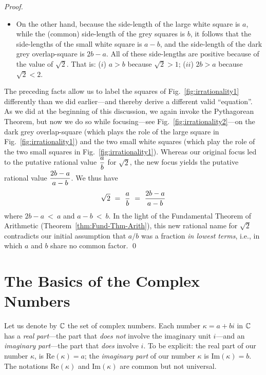 \begin{proof}
\begin{itemize}
\medskip\item
On the other hand, because the side-length of the large white square is $a$, while the (common) side-length of the grey squares is $b$, it follows that the side-lengths of the small white square is $a-b$, and the side-length of the dark grey overlap-square is $2b-a$.  All of these side-lengths are positive because of the value of $\sqrt{2}$.  That is: ($i$) $a > b$ because $\sqrt{2} >1$; ($ii$) $2b >a$ because $\sqrt{2} < 2$.
\end{itemize}
The preceding facts allow us to label the squares of Fig.~\ref{fig:irrationality1} differently than we did earlier---and thereby derive a different valid ``equation''.  As we did at the beginning of this discussion, we again invoke the Pythagorean Theorem, but now we do so while focusing---see Fig.~\ref{fig:irrationality2}---on the dark grey overlap-square (which plays the role of the large square in Fig.~\ref{fig:irrationality1}) and the two small white squares (which play the role of the two small squares in Fig.~\ref{fig:irrationality1}).  Whereas our original focus led to the putative rational value $\displaystyle {a \over b}$ for $\sqrt{2}$, the new focus yields the putative rational value $\displaystyle {2b-a \over a-b}$.  We thus have
\[ \sqrt{2} \ = \ {a \over b} \ = \ {2b-a \over a-b}  \]
where $2b-a \ < \ a$ and $a-b \ < \ b$.  In the light of the Fundamental Theorem of Arithmetic (Theorem~\ref{thm:Fund-Thm-Arith}), this new rational name for $\sqrt{2}$ contradicts our initial assumption that $a/b$ was a fraction {\em in lowest  terms}, i.e., in which $a$ and $b$ share no common factor.  \qed
\end{proof}


\section{The Basics of the Complex Numbers}
\label{sec:complexes}

 
 
Let us denote by $\mathbb{C}$ the set of complex numbers.  Each number $\kappa = a+bi$ in $\mathbb{C}$ has a {\it real}  {\em part}---the part that {\em does not} involve the imaginary unit $i$---and an {\it imaginary} {\em part}---the part that {\em does} involve $i$.  To be explicit: the real part of our number $\kappa$, is Re$(\kappa) = a$; the {\it imaginary part} of our number $\kappa$ is Im$(\kappa) = b$.  The notations Re$(\kappa)$ and Im$(\kappa)$ are common but not universal.

